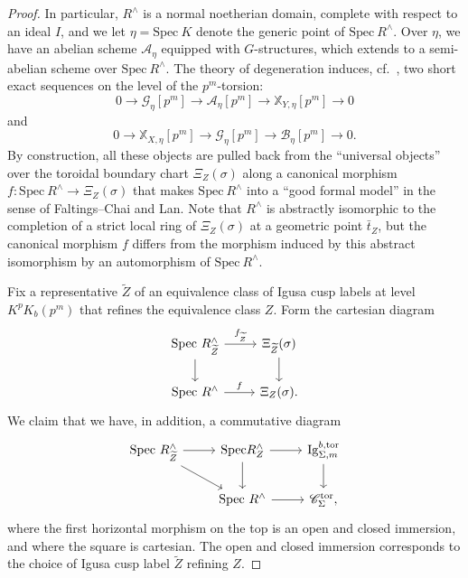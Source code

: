 \documentclass[letterpaper,11pt]{amsart}
\begin{document}
\begin{proof}
In particular, $R^{\wedge}$ is a normal noetherian domain, complete with respect to an ideal $I$, and we let $\eta = \mathrm{Spec}\ K$ denote the generic point of $\mathrm{Spec}\ R^\wedge$. Over $\eta$, we have an abelian scheme $\mathcal{A}_{\eta}$ equipped with $G$-structures, which extends to a semi-abelian scheme over $\mathrm{Spec}\ R^\wedge$. The theory of degeneration induces, cf.~\cite[Prop. 5.2.2.1]{lan-thesis}, two short exact sequences on the level of the $p^m$-torsion:
    \begin{equation}\label{eq:first ses}
    0\to \mathcal{G}_{\eta}[p^m]\to \mathcal{A}_{\eta}[p^m]\to \mathbb{X}_{Y, \eta}[p^m] \to 0 
    \end{equation}
    and 
    \begin{equation}\label{eq:second ses}
    0\to \mathbb{X}_{X,\eta}[p^m]\to\mathcal{G}_{\eta}[p^m]\to \mathcal{B}_{\eta}[p^m] \to 0.  
    \end{equation}
By construction, all these objects are pulled back from the ``universal objects'' over the toroidal boundary chart $\Xi_{Z}(\sigma)$ along a canonical morphism $f:\mathrm{Spec}\ R^{\wedge}\to \Xi_{Z}(\sigma)$ that makes $\mathrm{Spec}\ R^{\wedge}$ into a ``good formal model'' in the sense of Faltings--Chai and Lan. Note that $R^\wedge$ is abstractly isomorphic to the completion of a strict local ring of $\Xi_{Z}(\sigma)$ at a geometric point $\bar{t}_{Z}$, but the canonical morphism $f$ differs from the morphism induced by this abstract isomorphism by an automorphism of $\mathrm{Spec}\ R^{\wedge}$.     

Fix a representative $\widetilde{Z}$ of an equivalence class of Igusa cusp labels at level $K^pK_{b}(p^m)$ that refines the equivalence class $Z$. Form the cartesian diagram 
\begin{equation}\label{eq: Cartesian diagram chart}
\begin{tikzcd}
    \mathrm{Spec}\ R^\wedge_{\widetilde{Z}}\arrow[r,"f_{\widetilde{Z}}"]\arrow[d] & \Xi_{\widetilde{Z}}(\sigma) \arrow[d] \\ 
    \mathrm{Spec}\ R^\wedge \arrow[r, "f"] & \Xi_{Z}(\sigma).
\end{tikzcd}
\end{equation}
We claim that we have, in addition, a commutative diagram
\begin{equation}\label{eq: Cartesian diagram non-chart}
\begin{tikzcd}
   \mathrm{Spec}\ R^\wedge_{\widetilde{Z}} \arrow[r]\arrow[dr] & \mathrm{Spec} R^\wedge_Z \arrow[r]\arrow[d] & \mathrm{Ig}^{b,\mathrm{tor}}_{\Sigma, m}\arrow[d] \\ \ &\mathrm{Spec}\ R^\wedge \arrow[r] & \mathscr{C}^{\mathrm{tor}}_{\Sigma},
\end{tikzcd}
\end{equation}
where the first horizontal morphism on the top is an open and closed immersion, and where the square is cartesian. The open and closed immersion corresponds to the choice of Igusa cusp label $\widetilde{Z}$ refining $Z$. 


\end{proof}
\end{document}
